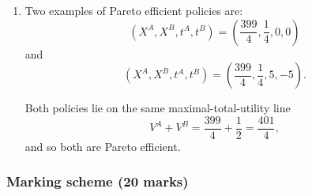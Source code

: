 \documentclass[12pt]{article}
\begin{document}
\begin{enumerate}[label=(\alph*)]
    \item
    Two examples of Pareto efficient policies are:
    \[
    \boxed{
    \left(X^A,X^B,t^A,t^B\right)
    =
    \left(\frac{399}{4},\frac14,0,0\right)}
    \]
    and
    \[
    \boxed{
    \left(X^A,X^B,t^A,t^B\right)
    =
    \left(\frac{399}{4},\frac14,5,-5\right).}
    \]

    Both policies lie on the same maximal-total-utility line
    \[
    V^A+V^B
    =
    \frac{399}{4}+\frac12
    =
    \frac{401}{4},
    \]
    and so both are Pareto efficient.
\end{enumerate}

\newpage
\subsubsection{Marking scheme (20 marks)}
\end{document}
